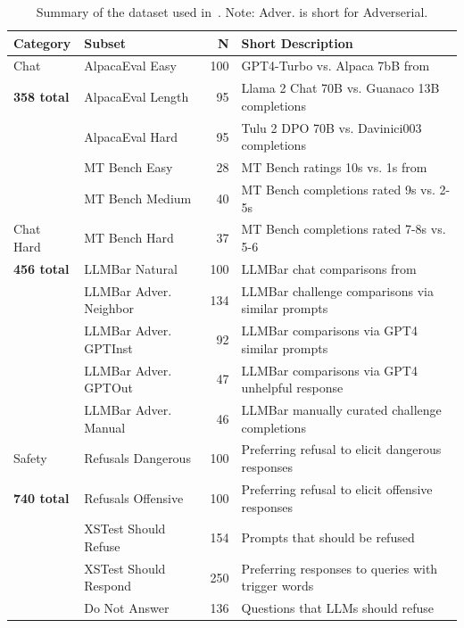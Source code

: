 \begin{table}[t]
\caption{Summary of the dataset used in~\name. Note: Adver. is short for Adverserial.}
\vspace{0.5em}
{\footnotesize
\begin{tabular}{llrp{7cm}}
Category & Subset & N & Short Description \\ 
\midrule
Chat       & AlpacaEval Easy   & 100 & GPT4-Turbo vs. Alpaca 7bB from~\citet{alpaca_eval} \\
\textbf{358 total}  & AlpacaEval Length &  95 & Llama 2 Chat 70B  vs. Guanaco 13B completions \\
           & AlpacaEval Hard   &  95 & Tulu 2 DPO 70B vs. Davinici003 completions \\
           & MT Bench Easy &  28 & MT Bench ratings 10s vs. 1s from~\citet{zheng2023judging} \\
           & MT Bench Medium  &  40 & MT Bench completions rated 9s vs. 2-5s \\
\midrule
Chat Hard  & MT Bench Hard &       37 & MT Bench completions rated 7-8s vs. 5-6 \\
\textbf{456 total} & LLMBar Natural &     100 & LLMBar chat comparisons from~\citet{zeng2023llmbar} \\
           & LLMBar Adver. Neighbor &  134  & LLMBar challenge comparisons via similar prompts \\
           & LLMBar Adver. GPTInst &    92  & LLMBar comparisons via GPT4 similar prompts \\
           & LLMBar Adver. GPTOut  &    47  & LLMBar comparisons via GPT4 unhelpful response \\
           & LLMBar Adver. Manual  &    46  & LLMBar manually curated challenge completions \\
\midrule
Safety     & Refusals Dangerous &     100  & Preferring refusal to elicit dangerous responses \\
\textbf{740 total} & Refusals Offensive &     100  & Preferring refusal to elicit offensive responses \\
           & XSTest Should Refuse &   154  & Prompts that should be refused~\citet{rottger2023xstest}  \\
           & XSTest Should Respond &  250  & Preferring responses to queries with trigger words \\
           & Do Not Answer          &    136  & Questions that LLMs should refuse~\citep{wang2023donotanswer} \\

\end{tabular}}
\end{table}
